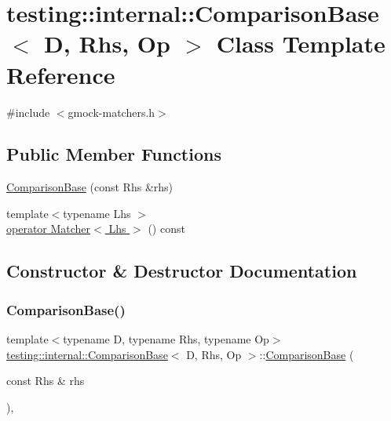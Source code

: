 \hypertarget{classtesting_1_1internal_1_1_comparison_base}{}\section{testing\+:\+:internal\+:\+:Comparison\+Base$<$ D, Rhs, Op $>$ Class Template Reference}
\label{classtesting_1_1internal_1_1_comparison_base}


{\ttfamily \#include $<$gmock-\/matchers.\+h$>$}

\subsection*{Public Member Functions}
\begin{DoxyCompactItemize}
\item 
\hyperlink{classtesting_1_1internal_1_1_comparison_base_a365f20e35a604195c869ec0c0bc4c3a3}{Comparison\+Base} (const Rhs \&rhs)
\item 
{\footnotesize template$<$typename Lhs $>$ }\\\hyperlink{classtesting_1_1internal_1_1_comparison_base_a071cdd47406c2e8df9c89bb99302eab9}{operator Matcher$<$ Lhs $>$} () const
\end{DoxyCompactItemize}


\subsection{Constructor \& Destructor Documentation}
\mbox{\label{classtesting_1_1internal_1_1_comparison_base_a365f20e35a604195c869ec0c0bc4c3a3}} 
\subsubsection{\texorpdfstring{Comparison\+Base()}{ComparisonBase()}}
{\footnotesize\ttfamily template$<$typename D, typename Rhs, typename Op$>$ \\
\hyperlink{classtesting_1_1internal_1_1_comparison_base}{testing\+::internal\+::\+Comparison\+Base}$<$ D, Rhs, Op $>$\+::\hyperlink{classtesting_1_1internal_1_1_comparison_base}{Comparison\+Base} (\begin{DoxyParamCaption}\item[{const Rhs \&}]{rhs }\end{DoxyParamCaption})\hspace{0.3cm}{\ttfamily [inline]}, {\ttfamily [explicit]}}



